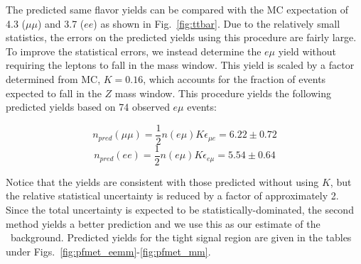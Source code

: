The predicted same flavor \ttbar yields 
can be compared 
with the MC expectation of 
4.3 %
($\mu\mu$) and 
3.7 %
($ee$) as shown in Fig.~\ref{fig:ttbar}.
Due to the relatively small statistics, the errors on the predicted yields 
using this procedure are fairly large.
To improve the statistical errors, we instead determine the $e\mu$ yield
without requiring the leptons to fall in the \Z mass window. 
This yield is scaled by a factor determined from MC, $K= 0.16$, %
which accounts for the fraction of \ttbar events expected to fall in the $Z$ mass
window. This procedure yields the following
predicted yields based on 74 observed $e\mu$ events: %

\begin{equation}
n_{pred}(\mu\mu) = \frac{1}{2}n(e\mu)K\epsilon_{\mu e} = 6.22 \pm 0.72
\end{equation}
\begin{equation}
n_{pred}(ee)     = \frac{1}{2}n(e\mu)K\epsilon_{e\mu} = 5.54 \pm 0.64
\end{equation}

Notice that the yields are consistent with those predicted without using $K$, but the relative statistical uncertainty is reduced by a factor of approximately 2.
Since the total uncertainty is expected to be statistically-dominated, the second method yields a better prediction and we use this as our estimate
of the \ttbar~background. Predicted yields for the tight signal region are given in the tables under Figs.~\ref{fig:pfmet_eemm}-\ref{fig:pfmet_mm}.

